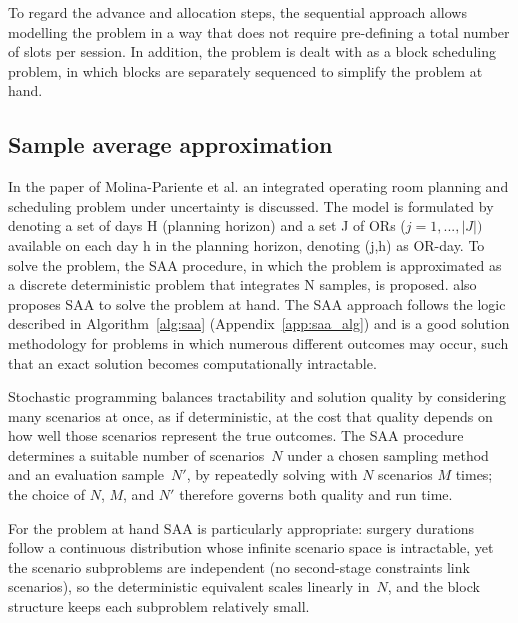 To regard the advance and allocation steps, the sequential approach allows modelling the problem in a way that does not require pre-defining a total number of slots per session. In addition, the problem is dealt with as a block scheduling problem, in which blocks are separately sequenced to simplify the problem at hand. 

\subsection{Sample average approximation}
In the paper of Molina-Pariente et al. \cite{Molina-Pariente2026} an integrated operating room planning and scheduling problem under uncertainty is discussed. The model is formulated by denoting a set of days H (planning horizon) and a set J of ORs ($j=1,...,|J|)$ available on each day h in the planning horizon, denoting (j,h) as OR-day. To solve the problem, the SAA procedure, in which the problem is approximated as a discrete deterministic problem that integrates N samples, is proposed. \cite{Denton2006} also proposes SAA to solve the problem at hand. The SAA approach \cite{Kleywegt} follows the logic described in Algorithm~\ref{alg:saa} (Appendix~\ref{app:saa_alg}) and is a good solution methodology for problems in which numerous different outcomes may occur, such that an exact solution becomes computationally intractable.

Stochastic programming balances tractability and solution quality by considering
many scenarios at once, as if deterministic, at the cost that quality depends on
how well those scenarios represent the true outcomes. The SAA procedure
determines a suitable number of scenarios~$N$ under a chosen sampling method and an evaluation
sample~$N'$, by repeatedly solving with $N$ scenarios $M$ times; the choice of
$N$, $M$, and $N'$ therefore governs both quality and run time.

For the problem at hand SAA is particularly appropriate: surgery durations follow
a continuous distribution whose infinite scenario space is intractable,
yet the scenario subproblems are independent (no second-stage constraints link
scenarios), so the deterministic equivalent scales linearly in~$N$, and the block
structure keeps each subproblem relatively small.